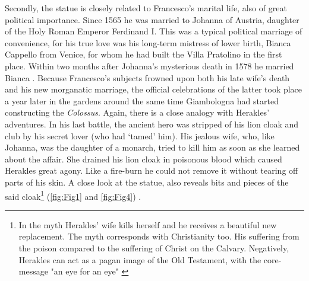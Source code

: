 Secondly, the statue is closely related to Francesco’s marital life, also of great political importance. Since 1565 he was married to Johanna of Austria, daughter of the Holy Roman Emperor Ferdinand I. This was a typical political marriage of convenience, for his true love was his long-term mistress of lower birth, Bianca Cappello from Venice, for whom he had built the Villa Pratolino in the first place. Within two months after Johanna’s mysterious death in 1578 he married Bianca \parencites[589-90]{Arba2012}. Because Francesco’s subjects frowned upon both his late wife’s death and his new morganatic marriage, the official celebrations of the latter took place a year later in the gardens around the same time Giambologna had started constructing the \textit{Colossus}. Again, there is a close analogy with Herakles’ adventures. In his last battle, the ancient hero was stripped of his lion cloak and club by his secret lover (who had ‘tamed’ him). His jealous wife, who, like Johanna, was the daughter of a monarch, tried to kill him as soon as she learned about the affair. She drained his lion cloak in poisonous blood which caused Herakles great agony. Like a fire-burn he could not remove it without tearing off parts of his skin. A close look at the statue, also reveals bits and pieces of the said cloak\footnote{In the myth Herakles' wife kills herself and he receives a beautiful new replacement. The myth corresponds with Christianity too. His suffering from the poison compared to the suffering of Christ on the Calvary. Negatively, Herakles can act as a pagan image of the Old Testament, with the core-message "an eye for an eye" \parencites[211,213,214-218]{Moormann2007}} (\cref{fig:Fig1} and \cref{fig:Fig4}) \parencites[211-213]{Moormann2007}[XI-XIII]{Hall1998}.


